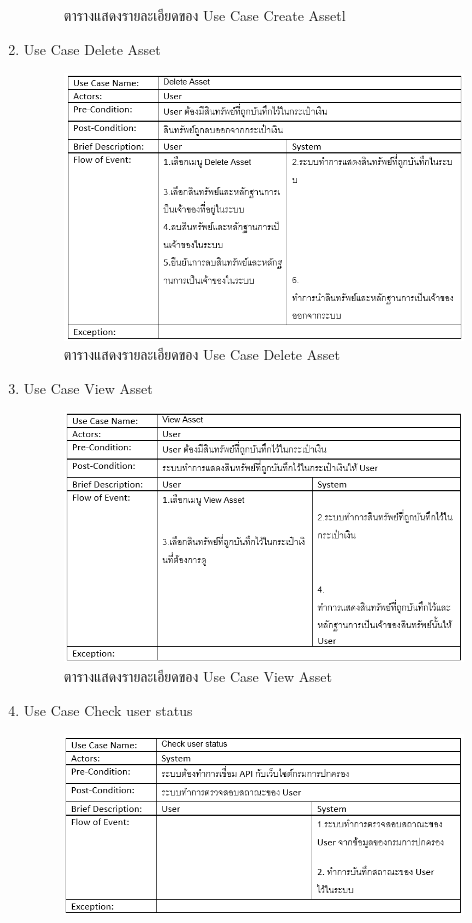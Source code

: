 \documentclass[12pt,oneside,openright,a4paper]{cpe-thai-project}
\begin{document}
\begin{enumerate}[label=\thesubsection.\arabic*,leftmargin=0pt,itemindent=2.5cm]
\begin{figure}[!htb]
		\caption{ตารางแสดงรายละเอียดของ Use Case Create Assetl}
	\end{figure}
	\FloatBarrier
\item Use Case Delete Asset
	\begin{figure}[!htb]
		\centering
		\includegraphics[scale=0.8]{deleteAsset}
		\caption{ตารางแสดงรายละเอียดของ Use Case Delete Asset}
	\end{figure}
	\FloatBarrier
\item Use Case View Asset
	\begin{figure}[!thb]
		\centering
		\includegraphics[scale=0.8]{viewAsset}
		\caption{ตารางแสดงรายละเอียดของ Use Case View Asset}
	\end{figure}
	\FloatBarrier
\item Use Case Check user status
	\begin{figure}[!thb]
		\centering
		\includegraphics[scale=0.8]{checkUserStatus}

\end{figure}
\end{enumerate}
\end{document}
